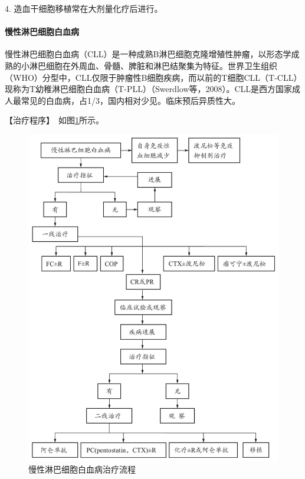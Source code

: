 4. 造血干细胞移植常在大剂量化疗后进行。

\paragraph{慢性淋巴细胞白血病}

慢性淋巴细胞白血病（CLL）是一种成熟B淋巴细胞克隆增殖性肿瘤，以形态学成熟的小淋巴细胞在外周血、骨髓、脾脏和淋巴结聚集为特征。世界卫生组织（WHO）分型中，CLL仅限于肿瘤性B细胞疾病，而以前的T细胞CLL（T-CLL）现称为T幼稚淋巴细胞白血病（T-PLL）（Swerdlow等，2008）。CLL是西方国家成人最常见的白血病，占1/3，国内相对少见。临床预后异质性大。

【治疗程序】　如图\ref{fig5-4-3}所示。

\begin{figure}[!htbp]
 \centering
 \includegraphics{./images/Image00156.jpg}
 \captionsetup{justification=centering}
 \caption{慢性淋巴细胞白血病治疗流程}
 \label{fig5-4-3}
  \end{figure} 

